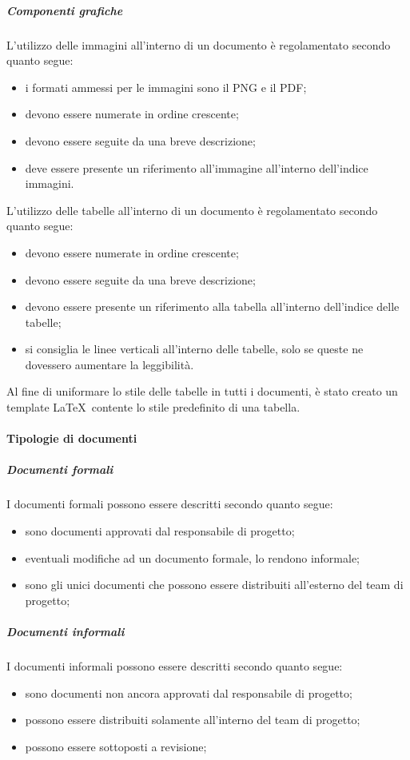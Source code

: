 \documentclass[../NormeProgetto.tex]{subfiles}
\begin{document}
		\subparagraph{Componenti grafiche}
			L'utilizzo delle immagini all'interno di un documento è regolamentato secondo quanto segue:
			\begin{itemize}
				\item i formati ammessi per le immagini sono il PNG e il PDF;
				\item devono essere numerate in ordine crescente;
				\item devono essere seguite da una breve descrizione;
				\item deve essere presente un riferimento all'immagine all'interno dell'indice immagini.
			\end{itemize}
			L'utilizzo delle tabelle all'interno di un documento è regolamentato secondo quanto segue:
			\begin{itemize}
				\item devono essere numerate in ordine crescente;
				\item devono essere seguite da una breve descrizione;
				\item devono essere presente un riferimento alla tabella all'interno dell'indice delle tabelle;
				\item si consiglia le linee verticali all'interno delle tabelle, solo se queste ne dovessero aumentare la leggibilità.
			\end{itemize}
			
			Al fine di uniformare lo stile delle tabelle in tutti i documenti, è stato creato un template \LaTeX\ contente lo stile predefinito di una tabella.
	
			
	\paragraph{Tipologie di documenti}
		\subparagraph{Documenti formali}
		I documenti formali possono essere descritti secondo quanto segue:
		\begin{itemize}
			\item sono documenti approvati dal responsabile di progetto;
			\item eventuali modifiche ad un documento formale, lo rendono informale;
			\item sono gli unici documenti che possono essere distribuiti all'esterno del team di progetto;
		\end{itemize}
		
		\subparagraph{Documenti informali}
		I documenti informali possono essere descritti secondo quanto segue:
		\begin{itemize}
			\item sono documenti non ancora approvati dal responsabile di progetto;
			\item possono essere distribuiti solamente all'interno del team di progetto;
			\item possono essere sottoposti a revisione; 
		\end{itemize}
		
\end{document}
